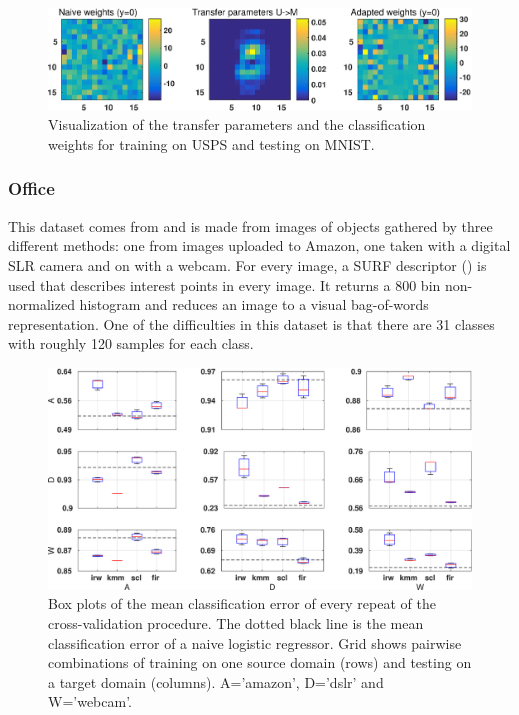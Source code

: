 \documentclass[twoside,11pt]{article}
\begin{document}
\begin{figure}[ht]
	\centering
	\includegraphics[width=.9\textwidth]{images/tf_digits.eps}
	\caption{Visualization of the transfer parameters and the classification weights for training on USPS and testing on MNIST.}
	\label{eg_digits2}
\end{figure}

\subsubsection{Office}
This dataset comes from \cite{saenko2010adapting} and is made from images of objects gathered by three different methods: one from images uploaded to Amazon, one taken with a digital SLR camera and on with a webcam. For every image, a SURF descriptor (\citealp{bay2006surf}) is used that describes interest points in every image. It returns a 800 bin non-normalized histogram and reduces an image to a visual bag-of-words representation. One of the difficulties in this dataset is that there are 31 classes with roughly 120 samples for each class. 

\begin{figure}[ht]
	\centering
	\includegraphics[width=.9\textwidth]{images/err_office_box.eps}
	\caption{Box plots of the mean classification error of every repeat of the cross-validation procedure. The dotted black line is the mean classification error of a naive logistic regressor. Grid shows pairwise combinations of training on one source domain (rows) and testing on a target domain (columns). A='amazon', D='dslr' and W='webcam'.}
	\label{err_office3}
\end{figure}
\end{document}
